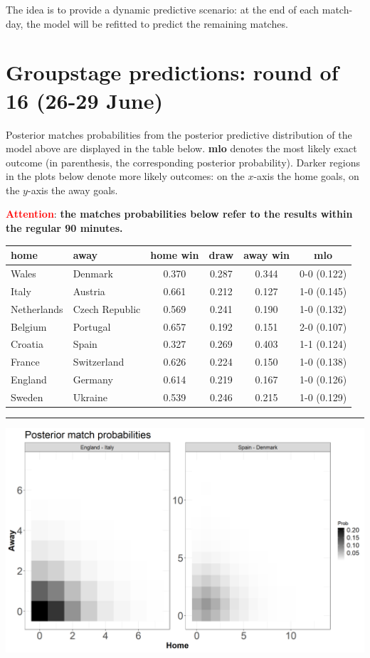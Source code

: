 \documentclass[
  10pt,
]{article}
\begin{document}
The idea is to provide a dynamic predictive scenario: at the end of each
match-day, the model will be refitted to predict the remaining matches.

\hypertarget{groupstage-predictions-round-of-16-26-29-june}{%
\section{Groupstage predictions: round of 16 (26-29
June)}\label{groupstage-predictions-round-of-16-26-29-june}}

Posterior matches probabilities from the posterior predictive
distribution of the model above are displayed in the table below.
\textbf{mlo} denotes the most likely exact outcome (in parenthesis, the
corresponding posterior probability). Darker regions in the plots below
denote more likely outcomes: on the \(x\)-axis the home goals, on the
\(y\)-axis the away goals.

\textcolor{red}{\textbf{Attention}}: \textbf{the matches probabilities below refer to the results within the regular 90 minutes.}

\begin{longtable}[]{@{}llcccc@{}}
\toprule
home & away & home win & draw & away win & mlo\tabularnewline
\midrule
\endhead
Wales & Denmark & 0.370 & 0.287 & 0.344 & 0-0 (0.122)\tabularnewline
Italy & Austria & 0.661 & 0.212 & 0.127 & 1-0 (0.145)\tabularnewline
Netherlands & Czech Republic & 0.569 & 0.241 & 0.190 & 1-0
(0.132)\tabularnewline
Belgium & Portugal & 0.657 & 0.192 & 0.151 & 2-0 (0.107)\tabularnewline
Croatia & Spain & 0.327 & 0.269 & 0.403 & 1-1 (0.124)\tabularnewline
France & Switzerland & 0.626 & 0.224 & 0.150 & 1-0
(0.138)\tabularnewline
England & Germany & 0.614 & 0.219 & 0.167 & 1-0 (0.126)\tabularnewline
Sweden & Ukraine & 0.539 & 0.246 & 0.215 & 1-0 (0.129)\tabularnewline
\bottomrule
\end{longtable}

\begin{center}\rule{0.5\linewidth}{0.5pt}\end{center}

\begin{center}\includegraphics[width=0.8\linewidth]{figs/data2-1} \end{center}
\end{document}
